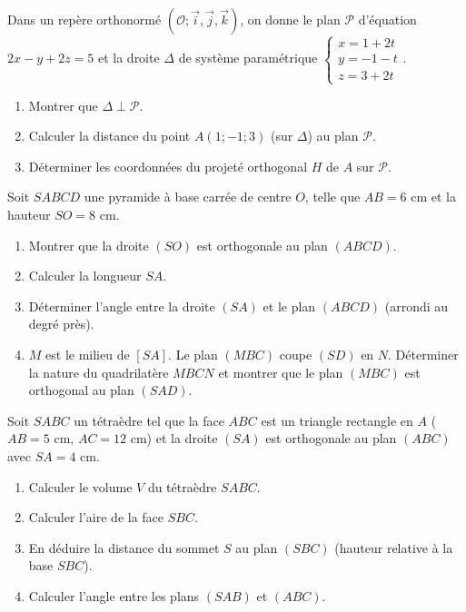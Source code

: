\documentclass[11pt]{article}
\newcounter{popsec}
\newcounter{popsub}
\newcommand{\courssub}[1]{%
  \stepcounter{popsub}%
  \par\vspace{9pt}\noindent{\popxbold\fontsize{11.5}{13}\selectfont\color{popink}{\color{poporange}\thepopsec.\thepopsub}\hspace{6pt}#1}\par\nopagebreak\vspace{4pt}
}
\begin{document}
\begin{exercice}
Dans un repère orthonormé $(\mathcal{O}; \vec{i}, \vec{j}, \vec{k})$, on donne le plan $\mathcal{P}$ d'équation $2x - y + 2z = 5$ et la droite $\Delta$ de système paramétrique $\begin{cases} x = 1 + 2t \\ y = -1 - t \\ z = 3 + 2t \end{cases}$.
\begin{enumerate}
    \item Montrer que $\Delta \perp \mathcal{P}$.
    \item Calculer la distance du point $A(1;-1;3)$ (sur $\Delta$) au plan $\mathcal{P}$.
    \item Déterminer les coordonnées du projeté orthogonal $H$ de $A$ sur $\mathcal{P}$.
\end{enumerate}
\end{exercice}

\courssub{Je m'entraîne}

\begin{exercice}
Soit $SABCD$ une pyramide à base carrée de centre $O$, telle que $AB = 6$ cm et la hauteur $SO = 8$ cm.
\begin{enumerate}
    \item Montrer que la droite $(SO)$ est orthogonale au plan $(ABCD)$.
    \item Calculer la longueur $SA$.
    \item Déterminer l'angle entre la droite $(SA)$ et le plan $(ABCD)$ (arrondi au degré près).
    \item $M$ est le milieu de $[SA]$. Le plan $(MBC)$ coupe $(SD)$ en $N$. Déterminer la nature du quadrilatère $MBCN$ et montrer que le plan $(MBC)$ est orthogonal au plan $(SAD)$.
\end{enumerate}
\end{exercice}

\begin{exercice}
Soit $SABC$ un tétraèdre tel que la face $ABC$ est un triangle rectangle en $A$ ($AB=5$ cm, $AC=12$ cm) et la droite $(SA)$ est orthogonale au plan $(ABC)$ avec $SA = 4$ cm.
\begin{enumerate}
    \item Calculer le volume $V$ du tétraèdre $SABC$.
    \item Calculer l'aire de la face $SBC$.
    \item En déduire la distance du sommet $S$ au plan $(SBC)$ (hauteur relative à la base $SBC$).
    \item Calculer l'angle entre les plans $(SAB)$ et $(ABC)$.
\end{enumerate}
\end{exercice}
\end{document}
